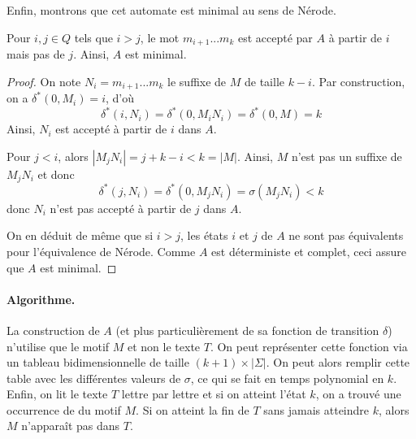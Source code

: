 Enfin, montrons que cet automate est minimal au sens de Nérode.

\begin{lemma}
Pour $i,j\in Q$ tels que $i>j$, le mot $m_{i+1}...m_k$ est accepté par $A$ à partir de $i$ mais pas de $j$. Ainsi, $A$ est minimal.
\end{lemma}

\begin{proof}
On note $N_i=m_{i+1}...m_k$ le suffixe de $M$ de taille $k-i$. Par construction, on a $\delta^*(0,M_i)=i$, d'où 
$$
\delta^*(i,N_i) = \delta^*(0,M_iN_i) = \delta^*(0,M)=k
$$
Ainsi, $N_i$ est accepté à partir de $i$ dans $A$.

Pour $j<i$, alors $|M_jN_i|=j+k-i<k = |M|$. Ainsi, $M$ n'est pas un suffixe de $M_jN_i$ et donc 
$$
\delta^*(j,N_i) = \delta^*(0,M_jN_i) = \sigma(M_jN_i)<k
$$
donc $N_i$ n'est pas accepté à partir de $j$ dans $A$.

On en déduit de même que si $i>j$, les états $i$ et $j$ de $A$ ne sont pas équivalents pour l'équivalence de Nérode. Comme $A$ est déterministe et complet, ceci assure que $A$ est minimal.
\end{proof}


\paragraph{Algorithme.}

La construction de $A$ (et plus particulièrement de sa fonction de transition $\delta$) n'utilise que le motif $M$ et non le texte $T$. On peut représenter cette fonction via un tableau bidimensionnelle de taille $(k+1)\times |\Sigma|$. On peut alors remplir cette table avec les différentes valeurs de $\sigma$, ce qui se fait en temps polynomial en $k$. Enfin, on lit le texte $T$ lettre par lettre et si on atteint l'état $k$, on a trouvé une occurrence de du motif $M$. Si on atteint la fin de $T$ sans jamais atteindre $k$, alors $M$ n'apparaît pas dans $T$.

